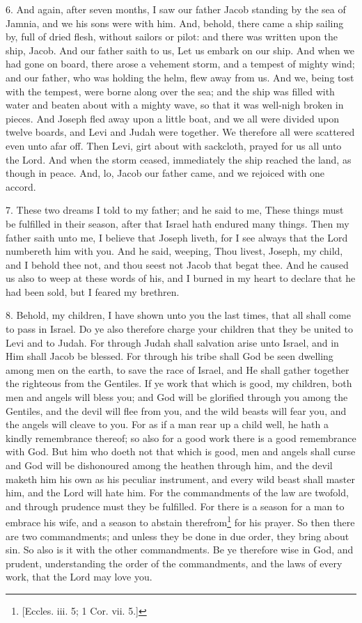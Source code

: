 6. And again, after seven months, I saw our father Jacob standing by the sea of Jamnia, and we his sons were with him. And, behold, there came a ship sailing by, full of dried flesh, without sailors or pilot: and there was written upon the ship, Jacob. And our father saith to us, Let us embark on our ship. And when we had gone on board, there arose a vehement storm, and a tempest of mighty wind; and our father, who was holding the helm, flew away from us. And we, being tost with the tempest, were borne along over the sea; and the ship was filled with water and beaten about with a mighty wave, so that it was well-nigh broken in pieces. And Joseph fled away upon a little boat, and we all were divided upon twelve boards, and Levi and Judah were together. We therefore all were scattered even unto afar off. Then Levi, girt about with sackcloth, prayed for us all unto the Lord. And when the storm ceased, immediately the ship reached the land, as though in peace. And, lo, Jacob our father came, and we rejoiced with one accord.

7. These two dreams I told to my father; and he said to me, These things must be fulfilled in their season, after that Israel hath endured many things. Then my father saith unto me, I believe that Joseph liveth, for I see always that the Lord numbereth him with you. And he said, weeping, Thou livest, Joseph, my child, and I behold thee not, and thou seest not Jacob that begat thee. And he caused us also to weep at these words of his, and I burned in my heart to declare that he had been sold, but I feared my brethren.

8. Behold, my children, I have shown unto you the last times, that all shall come to pass in Israel. Do ye also therefore charge your children that they be united to Levi and to Judah. For through Judah shall salvation arise unto Israel, and in Him shall Jacob be blessed. For through his tribe shall God be seen dwelling among men on the earth, to save the race of Israel, and He shall gather together the righteous from the Gentiles. If ye work that which is good, my children, both men and angels will bless you; and God will be glorified through you among the Gentiles, and the devil will flee from you, and the wild beasts will fear you, and the angels will cleave to you. For as if a man rear up a child well, he hath a kindly remembrance thereof; so also for a good work there is a good remembrance with God. But him who doeth not that which is good, men and angels shall curse and God will be dishonoured among the heathen through him, and the devil maketh him his own as his peculiar instrument, and every wild beast shall master him, and the Lord will hate him. For the commandments of the law are twofold, and through prudence must they be fulfilled. For there is a season for a man to embrace his wife, and a season to abstain therefrom\footnote{[Eccles. iii. 5; 1 Cor. vii. 5.]} for his prayer. So then there are two commandments; and unless they be done in due order, they bring about sin. So also is it with the other commandments. Be ye therefore wise in God, and prudent, understanding the order of the commandments, and the laws of every work, that the Lord may love you.

